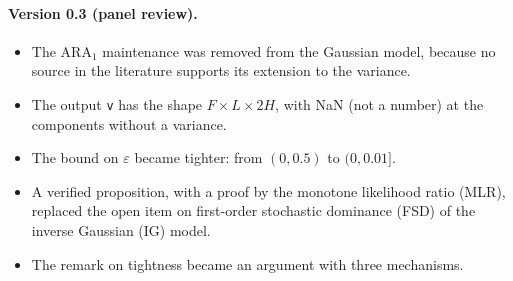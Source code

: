 \documentclass[11pt,a4paper]{article}
\theoremstyle{plain}
\theoremstyle{definition}
\theoremstyle{remark}
\begin{document}
\paragraph{Version 0.3 (panel review).}
\begin{itemize}
  \item The $\text{ARA}_1$ maintenance was removed from the Gaussian model, because no source in the literature supports its extension to the variance.
  \item The output \texttt{v} has the shape $F \times L \times 2H$, with NaN (not a number) at the components without a variance.
  \item The bound on $\varepsilon$ became tighter: from $(0, 0.5)$ to $(0, 0.01]$.
  \item A verified proposition, with a proof by the monotone likelihood ratio (MLR), replaced the open item on first-order stochastic dominance (FSD) of the inverse Gaussian (IG) model.
  \item The remark on tightness became an argument with three mechanisms.
\end{itemize}
\end{document}
